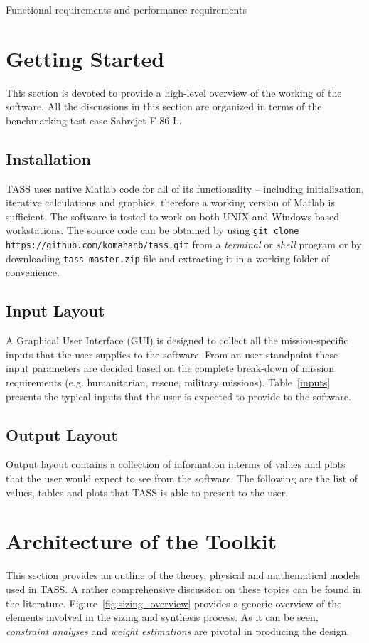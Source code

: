 \documentclass[pdftex,11pt,letter]{article}
\begin{document}
Functional requirements and performance requirements

\section{Getting Started}\label{layout}

This section is devoted to provide a high-level overview of the working of the software.  All the discussions in this section are organized in terms of the benchmarking test case Sabrejet F-86 L\cite{}.


\subsection{Installation}

TASS uses native Matlab code for all of its functionality -- including initialization, iterative calculations and graphics, therefore a working version of Matlab\cite{MATLAB} is sufficient. The software is tested to work on both UNIX and Windows based workstations. The source code can be obtained by using \texttt{git clone https://github.com/komahanb/tass.git} from a \textit{terminal} or \textit{shell} program or by downloading \texttt{tass-master.zip} file and extracting it in a working folder of convenience. 

\subsection{Input Layout}
A Graphical User Interface (GUI) is designed to collect all the mission-specific inputs that the user supplies to the software. From an user-standpoint these input parameters are decided based on the complete break-down of mission requirements (e.g. humanitarian, rescue, military missions). Table~\ref{inputs} presents the typical inputs that the user is expected to provide to the software. 

\subsection{Output Layout}
Output layout contains a collection of information interms of values and plots that the user would expect to see from the software. The following are the list of values, tables and plots that TASS is able to present to the user.

\section{Architecture of the Toolkit}\label{theory}
This section provides an outline of the theory, physical and mathematical models used in TASS. A rather comprehensive discussion on these topics can be found in the literature\cite{MattinglyText,NicolaiText,FieldingText,HoweText,RaymerText}. Figure~\ref{fig:sizing_overview} provides a generic overview of the elements involved in the sizing and synthesis process. As it can be seen, \emph{constraint analyses} and \emph{weight estimations} are pivotal in producing the design.
\end{document}
